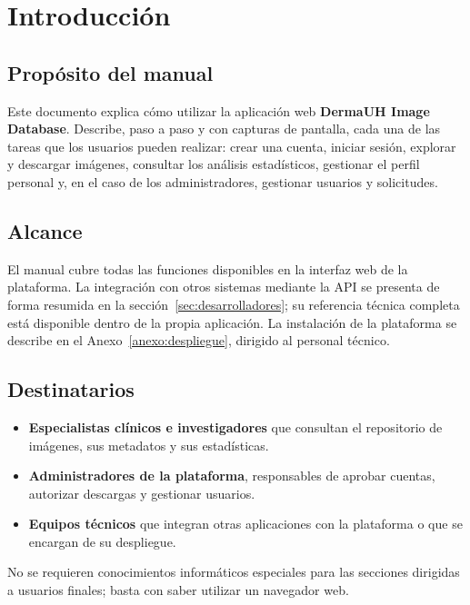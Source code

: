 \documentclass[11pt,a4paper]{article}
\newcommand{\seccion}[1]{\clearpage\section{#1}}
\begin{document}
\clearpage
\tableofcontents
\clearpage
\listoffigures

\seccion{Introducción}

\subsection{Propósito del manual}

Este documento explica cómo utilizar la aplicación web \textbf{DermaUH Image
Database}. Describe, paso a paso y con capturas de pantalla, cada una de las
tareas que los usuarios pueden realizar: crear una cuenta, iniciar sesión,
explorar y descargar imágenes, consultar los análisis estadísticos, gestionar el
perfil personal y, en el caso de los administradores, gestionar usuarios y
solicitudes.

\subsection{Alcance}

El manual cubre todas las funciones disponibles en la interfaz web de la
plataforma. La integración con otros sistemas mediante la API se presenta de forma
resumida en la sección~\ref{sec:desarrolladores}; su referencia técnica completa
está disponible dentro de la propia aplicación. La instalación de la plataforma se
describe en el Anexo~\ref{anexo:despliegue}, dirigido al personal técnico.

\subsection{Destinatarios}

\begin{itemize}
  \item \textbf{Especialistas clínicos e investigadores} que consultan el
  repositorio de imágenes, sus metadatos y sus estadísticas.
  \item \textbf{Administradores de la plataforma}, responsables de aprobar cuentas,
  autorizar descargas y gestionar usuarios.
  \item \textbf{Equipos técnicos} que integran otras aplicaciones con la plataforma
  o que se encargan de su despliegue.
\end{itemize}

No se requieren conocimientos informáticos especiales para las secciones
dirigidas a usuarios finales; basta con saber utilizar un navegador web.
\end{document}
